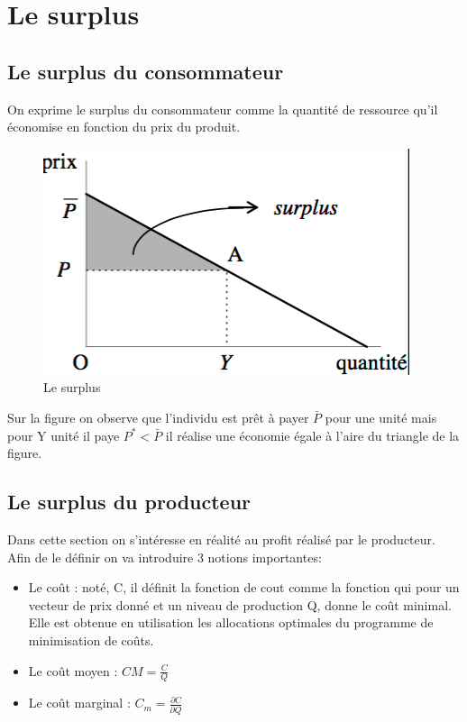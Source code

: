 \section{Le surplus}

\subsection{Le surplus du consommateur}

On exprime le surplus du consommateur comme la quantité de ressource qu'il économise en fonction du prix du produit. 

\begin{figure}[h]
\begin{center}
\includegraphics[scale=0.3]{./img/IM5}
\caption{Le surplus}
\end{center}
\end{figure}

Sur la figure on observe que l'individu est prêt à payer $\bar{P}$ pour une unité mais pour Y unité il paye $P^*<\bar{P}$ il réalise une économie égale à l'aire du triangle de la figure.

\subsection{Le surplus du producteur}

Dans cette section on s'intéresse en réalité au profit réalisé par le producteur. Afin de le définir on va introduire 3 notions importantes:
\begin{itemize}
\item Le coût : noté, C, il définit la fonction de cout comme la fonction qui pour un vecteur de prix donné et un niveau de production Q, donne le coût minimal. Elle est obtenue en utilisation les allocations optimales du programme de minimisation de coûts.
\item Le coût moyen : $CM=\frac{C}{Q}$
\item Le coût marginal : $C_m = \frac{\partial C}{\partial Q}$

\end{itemize}

